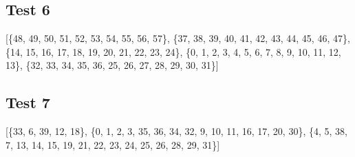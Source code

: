 \documentclass{article}
\begin{document}
\subsection{Test 6}
    \begin{center}
    \end{center}
    [\{48, 49, 50, 51, 52, 53, 54, 55, 56, 57\}, \{37, 38, 39, 40, 41, 42, 43, 44, 45, 46, 47\}, \{14, 15, 16, 17, 18, 19, 20, 21, 22, 23, 24\}, \{0, 1, 2, 3, 4, 5, 6, 7, 8, 9, 10, 11, 12, 13\}, \{32, 33, 34, 35, 36, 25, 26, 27, 28, 29, 30, 31\}]
\subsection{Test 7}
    \begin{center}
    \end{center}
    [\{33, 6, 39, 12, 18\}, \{0, 1, 2, 3, 35, 36, 34, 32, 9, 10, 11, 16, 17, 20, 30\}, \{4, 5, 38, 7, 13, 14, 15, 19, 21, 22, 23, 24, 25, 26, 28, 29, 31\}]
\end{document}
